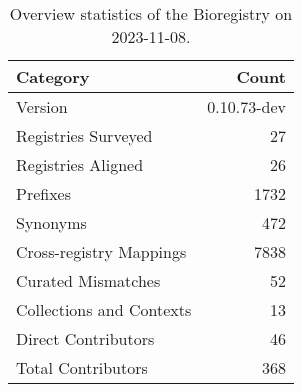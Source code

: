 \begin{table}
\caption{Overview statistics of the Bioregistry on 2023-11-08.}
\label{tab:bioregistry-summary}
\begin{tabular}{lr}
\toprule
Category & Count \\
\midrule
Version & 0.10.73-dev \\
Registries Surveyed & 27 \\
Registries Aligned & 26 \\
Prefixes & 1732 \\
Synonyms & 472 \\
Cross-registry Mappings & 7838 \\
Curated Mismatches & 52 \\
Collections and Contexts & 13 \\
Direct Contributors & 46 \\
Total Contributors & 368 \\
\bottomrule
\end{tabular}
\end{table}
